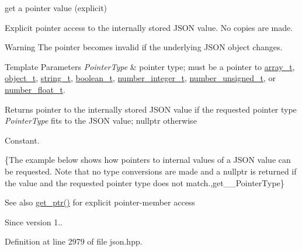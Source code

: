 get a pointer value (explicit) 

Explicit pointer access to the internally stored J\+S\+O\+N value. No copies are made.

\begin{DoxyWarning}{Warning}
The pointer becomes invalid if the underlying J\+S\+O\+N object changes.
\end{DoxyWarning}

\begin{DoxyTemplParams}{Template Parameters}
{\em Pointer\+Type} & pointer type; must be a pointer to \hyperlink{classnlohmann_1_1basic__json_ab00b882d39306d663c23dab110f5cae0}{array\+\_\+t}, \hyperlink{classnlohmann_1_1basic__json_a0ac9894c9de8dc551cf2e5f1c605537f}{object\+\_\+t}, \hyperlink{classnlohmann_1_1basic__json_ab63e618bbb0371042b1bec17f5891f42}{string\+\_\+t}, \hyperlink{classnlohmann_1_1basic__json_af3bc3e83aa162d7ba4df16a949872723}{boolean\+\_\+t}, \hyperlink{classnlohmann_1_1basic__json_ac4b10b2364f26ce47bdb9a413ff04a59}{number\+\_\+integer\+\_\+t}, \hyperlink{classnlohmann_1_1basic__json_a60a04166c122072ab11eaf9845d9cd1d}{number\+\_\+unsigned\+\_\+t}, or \hyperlink{classnlohmann_1_1basic__json_a74a0013e847fdc574b48f931f0e757e1}{number\+\_\+float\+\_\+t}.\\
\hline
\end{DoxyTemplParams}
\begin{DoxyReturn}{Returns}
pointer to the internally stored J\+S\+O\+N value if the requested pointer type {\itshape Pointer\+Type} fits to the J\+S\+O\+N value; {\ttfamily nullptr} otherwise
\end{DoxyReturn}
Constant.

\{The example below shows how pointers to internal values of a J\+S\+O\+N value can be requested. Note that no type conversions are made and a {\ttfamily nullptr} is returned if the value and the requested pointer type does not match.,get\+\_\+\+\_\+\+Pointer\+Type\}

\begin{DoxySeeAlso}{See also}
\hyperlink{classnlohmann_1_1basic__json_a7ab11375ed2e29c2fcb6119386851445}{get\+\_\+ptr()} for explicit pointer-\/member access
\end{DoxySeeAlso}
\begin{DoxySince}{Since}
version 1.. 
\end{DoxySince}


Definition at line 2979 of file json.\+hpp.

\hypertarget{classnlohmann_1_1basic__json_a363da77bc39cae041d59ee334ac4f41b}{}
